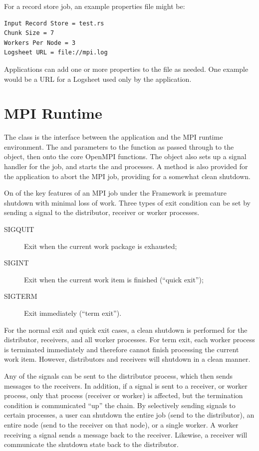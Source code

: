 For a record store job, an example properties file might be:
\begin{verbatim}
Input Record Store = test.rs
Chunk Size = 7
Workers Per Node = 3
Logsheet URL = file://mpi.log
\end{verbatim}

Applications can add one or more properties to the file as needed. One example
would be a URL for a Logsheet used only by the application.

\section{MPI Runtime}
\label{sec-mpiruntime}

The  class is the interface between the application and the
MPI runtime environment. The  and  parameters
to the  function as passed through to the 
object, then onto the core OpenMPI functions. The  object 
also sets up a signal handler for the job, and starts the 
and  processes.  A method is also provided for the application
to abort the MPI job, providing for a somewhat clean shutdown.

On of the key features of an MPI job under the Framework is premature shutdown
with minimal loss of work. Three types of exit condition can be set by sending
a signal to the distributor, receiver or worker processes. 

\begin{description}
\item[SIGQUIT] Exit when the current work package is exhausted;
\item[SIGINT] Exit when the current work item is finished (``quick exit'');
\item[SIGTERM] Exit immediately (``term exit'').
\end{description}

For the normal exit and quick exit cases, a clean shutdown is performed for
the distributor, receivers, and all worker processes. For term exit, each
worker process is terminated immediately and therefore cannot finish processing
the current work item. However, distributors and receivers will shutdown in a
clean manner.

Any of the signals can be sent to the distributor process, which then sends
messages to the receivers. In addition, if a signal is sent to a receiver, or
worker process, only that process (receiver or worker) is affected, but the
termination condition is communicated ``up'' the chain. By selectively sending
signals to certain processes, a user can shutdown the entire job (send to the
distributor), an entire node (send to the receiver on that node), or a single
worker. A worker receiving a signal sends a message back to the receiver.
Likewise, a receiver will communicate the shutdown state back to the
distributor.

